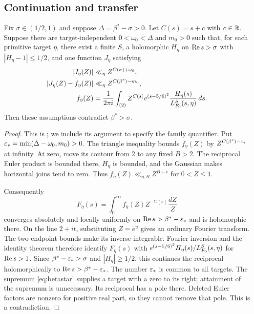 \subsection{Continuation and transfer}
\begin{proposition}\label{prop:continuation}
Fix $\sigma\in(1/2,1)$ and suppose $\Delta=\beta^*-\sigma>0$. Let $C(s)=s+c$ with $c\in\mathbb R$. Suppose there are target-independent $0<\omega_0<\Delta$ and $m_0>0$ such that, for each primitive target $\eta$, there exist a finite $S$, a holomorphic $H_\eta$ on $\operatorname{Re} s>\sigma$ with $|H_\eta-1|\le1/2$, and one function $J_\eta$ satisfying
\begin{align*}
 |J_\eta(Z)|&\ll_\eta Z^{C(\sigma)+\omega_0},\\
 |J_\eta(Z)-f_\eta(Z)|&\ll_\eta Z^{C(\beta^*)-m_0},\\
 f_\eta(Z)&=\frac1{2\pi i}\int_{(2)} Z^{C(s)}e^{(s-5/6)^2}
             \frac{H_\eta(s)}{L_{F_0}^S(s,\eta)}\,ds.
\end{align*}
Then these assumptions contradict $\beta^*>\sigma$.
\end{proposition}
\begin{proof}
This is ; we include its argument to specify the family quantifier. Put $\varepsilon_* =\min(\Delta-\omega_0,m_0)>0$. The triangle inequality bounds $f_\eta(Z)$ by $Z^{C(\beta^*)-\varepsilon_*}$ at infinity. At zero, move its contour from $2$ to any fixed $B>2$. The reciprocal Euler product is bounded there, $H_\eta$ is bounded, and the Gaussian makes horizontal joins tend to zero. Thus $f_\eta(Z)\ll_{\eta,B}Z^{B+c}$ for $0<Z\le1$.

Consequently
\[
 F_\eta(s)=\int_0^\infty f_\eta(Z)Z^{-C(s)}\frac{dZ}{Z}
\]
converges absolutely and locally uniformly on $\operatorname{Re} s>\beta^*-\varepsilon_*$ and is holomorphic there. On the line $2+it$, substituting $Z=e^u$ gives an ordinary Fourier transform. The two endpoint bounds make its inverse integrable. Fourier inversion and the identity theorem therefore identify $F_\eta(s)$ with $e^{(s-5/6)^2}H_\eta(s)/L_{F_0}^S(s,\eta)$ for $\operatorname{Re} s>1$. Since $\beta^*-\varepsilon_*>\sigma$ and $|H_\eta|\ge1/2$, this continues the reciprocal holomorphically to $\operatorname{Re} s>\beta^*-\varepsilon_*$. The number $\varepsilon_*$ is common to all targets. The supremum \eqref{eq:betastar} supplies a target with a zero to its right; attainment of the supremum is unnecessary. Its reciprocal has a pole there. Deleted Euler factors are nonzero for positive real part, so they cannot remove that pole. This is a contradiction.
\end{proof}

